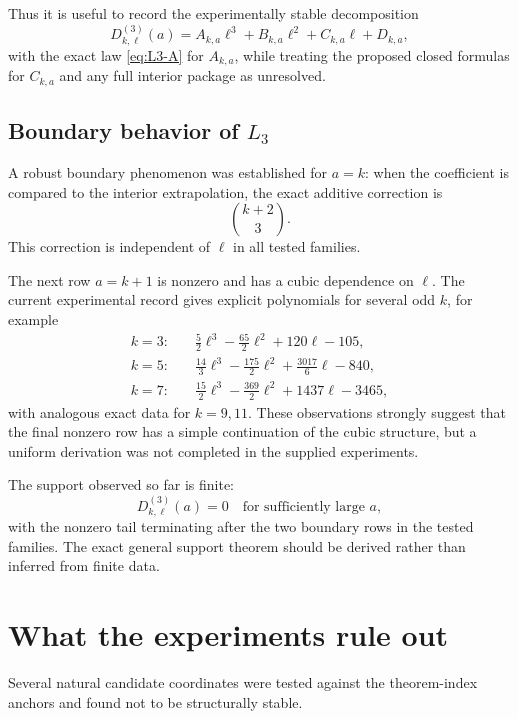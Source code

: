 \documentclass[11pt]{article}
\theoremstyle{remark}
\begin{document}
Thus it is useful to record the experimentally stable decomposition
\[
    D^{(3)}_{k,\ell}(a)
    =A_{k,a}\ell^3+B_{k,a}\ell^2+C_{k,a}\ell+D_{k,a},
\]
with the exact law \eqref{eq:L3-A} for \(A_{k,a}\), while treating the proposed
closed formulas for \(C_{k,a}\) and any full interior package as unresolved.

\subsection{Boundary behavior of \(L_3\)}

A robust boundary phenomenon was established for \(a=k\): when the coefficient is
compared to the interior extrapolation, the exact additive correction is
\begin{equation}
    \boxed{\binom{k+2}{3}}.
\label{eq:L3-k-correction}
\end{equation}
This correction is independent of \(\ell\) in all tested families.

The next row \(a=k+1\) is nonzero and has a cubic dependence on \(\ell\).  The current
experimental record gives explicit polynomials for several odd \(k\), for example
\[
\begin{aligned}
 k=3:&\quad \frac52\ell^3-\frac{65}{2}\ell^2+120\ell-105,\\
 k=5:&\quad \frac{14}{3}\ell^3-\frac{175}{2}\ell^2+\frac{3017}{6}\ell-840,\\
 k=7:&\quad \frac{15}{2}\ell^3-\frac{369}{2}\ell^2+1437\ell-3465,
\end{aligned}
\]
with analogous exact data for \(k=9,11\).  These observations strongly suggest
that the final nonzero row has a simple continuation of the cubic structure, but a
uniform derivation was not completed in the supplied experiments.

The support observed so far is finite:
\[
    D^{(3)}_{k,\ell}(a)=0
    \quad\text{for sufficiently large }a,
\]
with the nonzero tail terminating after the two boundary rows in the tested
families.  The exact general support theorem should be derived rather than inferred
from finite data.

\section{What the experiments rule out}

Several natural candidate coordinates were tested against the theorem-index anchors
and found not to be structurally stable.
\end{document}

